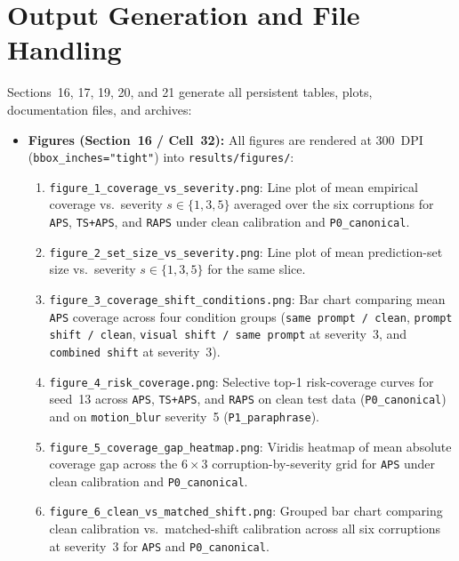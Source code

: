 \documentclass[11pt,a4paper]{article}
\begin{document}
\section{Output Generation and File Handling}
\label{sec:outputs}

Sections~16, 17, 19, 20, and 21 generate all persistent tables, plots, documentation files, and archives:
\begin{itemize}
  \item \textbf{Figures (Section~16 / Cell~32):} All figures are rendered at 300~DPI (\texttt{bbox\_\allowbreak{}inches="tight"}) into \texttt{results/\allowbreak{}figures/\allowbreak{}}:
  \begin{enumerate}
    \item \texttt{figure\_\allowbreak{}1\_\allowbreak{}coverage\_\allowbreak{}vs\_\allowbreak{}severity.png}: Line plot of mean empirical coverage vs.\ severity $s \in \{1, 3, 5\}$ averaged over the six corruptions for \texttt{APS}, \texttt{TS+APS}, and \texttt{RAPS} under clean calibration and \texttt{P0\_\allowbreak{}canonical}.
    \item \texttt{figure\_\allowbreak{}2\_\allowbreak{}set\_\allowbreak{}size\_\allowbreak{}vs\_\allowbreak{}severity.png}: Line plot of mean prediction-set size vs.\ severity $s \in \{1, 3, 5\}$ for the same slice.
    \item \texttt{figure\_\allowbreak{}3\_\allowbreak{}coverage\_\allowbreak{}shift\_\allowbreak{}conditions.png}: Bar chart comparing mean \texttt{APS} coverage across four condition groups (\texttt{same prompt /\allowbreak{} clean}, \texttt{prompt shift /\allowbreak{} clean}, \texttt{visual shift /\allowbreak{} same prompt} at severity~3, and \texttt{combined shift} at severity~3).
    \item \texttt{figure\_\allowbreak{}4\_\allowbreak{}risk\_\allowbreak{}coverage.png}: Selective top-1 risk-coverage curves for seed~13 across \texttt{APS}, \texttt{TS+APS}, and \texttt{RAPS} on clean test data (\texttt{P0\_\allowbreak{}canonical}) and on \texttt{motion\_\allowbreak{}blur} severity~5 (\texttt{P1\_\allowbreak{}paraphrase}).
    \item \texttt{figure\_\allowbreak{}5\_\allowbreak{}coverage\_\allowbreak{}gap\_\allowbreak{}heatmap.png}: Viridis heatmap of mean absolute coverage gap across the $6 \times 3$ corruption-by-severity grid for \texttt{APS} under clean calibration and \texttt{P0\_\allowbreak{}canonical}.
    \item \texttt{figure\_\allowbreak{}6\_\allowbreak{}clean\_\allowbreak{}vs\_\allowbreak{}matched\_\allowbreak{}shift.png}: Grouped bar chart comparing clean calibration vs.\ matched-shift calibration across all six corruptions at severity~3 for \texttt{APS} and \texttt{P0\_\allowbreak{}canonical}.

\end{enumerate}
\end{itemize}
\end{document}
